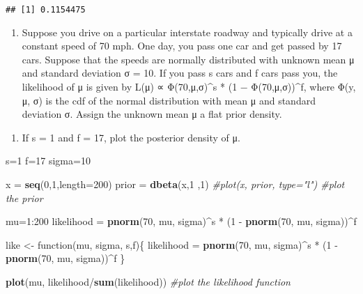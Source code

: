 \documentclass[]{tufte-handout}
\newenvironment{Shaded}{}{}
\newcommand{\KeywordTok}[1]{\textcolor[rgb]{0.00,0.44,0.13}{\textbf{{#1}}}}
\newcommand{\DataTypeTok}[1]{\textcolor[rgb]{0.56,0.13,0.00}{{#1}}}
\newcommand{\DecValTok}[1]{\textcolor[rgb]{0.25,0.63,0.44}{{#1}}}
\newcommand{\StringTok}[1]{\textcolor[rgb]{0.25,0.44,0.63}{{#1}}}
\newcommand{\CommentTok}[1]{\textcolor[rgb]{0.38,0.63,0.69}{\textit{{#1}}}}
\newcommand{\NormalTok}[1]{{#1}}
\begin{document}
\begin{verbatim}
## [1] 0.1154475
\end{verbatim}

\begin{enumerate}
\def\labelenumi{\arabic{enumi}.}
\setcounter{enumi}{5}
\itemsep1pt\parskip0pt
\item
  Suppose you drive on a particular interstate roadway and typically
  drive at a constant speed of 70 mph. One day, you pass one car and get
  passed by 17 cars. Suppose that the speeds are normally distributed
  with unknown mean μ and standard deviation σ = 10. If you pass s cars
  and f cars pass you, the likelihood of μ is given by L(μ) ∝
  Φ(70,μ,σ)\^{}s * (1 − Φ(70,μ,σ))\^{}f, where Φ(y, μ, σ) is the cdf of
  the normal distribution with mean μ and standard deviation σ. Assign
  the unknown mean μ a flat prior density.
\end{enumerate}

\begin{enumerate}
\def\labelenumi{\alph{enumi})}
\itemsep1pt\parskip0pt
\item
  If s = 1 and f = 17, plot the posterior density of μ.
\end{enumerate}

\begin{Shaded}
\begin{Highlighting}[]
\NormalTok{s=}\DecValTok{1}
\NormalTok{f=}\DecValTok{17} 
\NormalTok{sigma=}\DecValTok{10}

\NormalTok{x =}\StringTok{ }\KeywordTok{seq}\NormalTok{(}\DecValTok{0}\NormalTok{,}\DecValTok{1}\NormalTok{,}\DataTypeTok{length=}\DecValTok{200}\NormalTok{)}
\NormalTok{prior =}\StringTok{ }\KeywordTok{dbeta}\NormalTok{(x,}\DecValTok{1} \NormalTok{,}\DecValTok{1}\NormalTok{) }
\CommentTok{#plot(x, prior, type="l") #plot the prior}

\NormalTok{mu=}\DecValTok{1}\NormalTok{:}\DecValTok{200}
\NormalTok{likelihood =}\StringTok{ }\KeywordTok{pnorm}\NormalTok{(}\DecValTok{70}\NormalTok{, mu, sigma)^s *}\StringTok{ }\NormalTok{(}\DecValTok{1} \NormalTok{-}\StringTok{ }\KeywordTok{pnorm}\NormalTok{(}\DecValTok{70}\NormalTok{, mu, sigma))^f}

\NormalTok{like <-}\StringTok{ }\NormalTok{function(mu, sigma, s,f)\{}
  \NormalTok{likelihood =}\StringTok{ }\KeywordTok{pnorm}\NormalTok{(}\DecValTok{70}\NormalTok{, mu, sigma)^s *}\StringTok{ }\NormalTok{(}\DecValTok{1} \NormalTok{-}\StringTok{ }\KeywordTok{pnorm}\NormalTok{(}\DecValTok{70}\NormalTok{, mu, sigma))^f}
\NormalTok{\}}

\KeywordTok{plot}\NormalTok{(mu, likelihood/}\KeywordTok{sum}\NormalTok{(likelihood)) }\CommentTok{#plot the likelihood function}
\end{Highlighting}
\end{Shaded}
\end{document}
